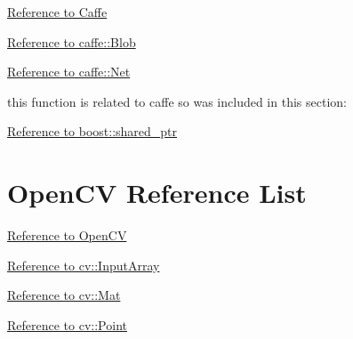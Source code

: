 \documentclass{scrreprt}
\begin{document}
\href{http://caffe.berkeleyvision.org/doxygen/index.html}{Reference to Caffe}

\href{http://caffe.berkeleyvision.org/doxygen/classcaffe_1_1Blob.html}{Reference to caffe::Blob}

\href{http://caffe.berkeleyvision.org/doxygen/classcaffe_1_1Net.html}{Reference to caffe::Net}

this function is related to caffe so was included in this section:

\href{http://www.boost.org/doc/libs/1_63_0/libs/smart_ptr/shared_ptr.htm}{Reference to boost::shared\_ptr}


\section{OpenCV Reference List}

\href{http://docs.opencv.org/3.1.0/}{Reference to OpenCV}

\href{http://docs.opencv.org/3.1.0/d4/d32/classcv_1_1__InputArray.html}{Reference to cv::InputArray}

\href{http://docs.opencv.org/3.1.0/d3/d63/classcv_1_1Mat.html#details}{Reference to cv::Mat}

\href{http://docs.opencv.org/3.1.0/db/d4e/classcv_1_1Point__.html}{Reference to cv::Point}
\end{document}
